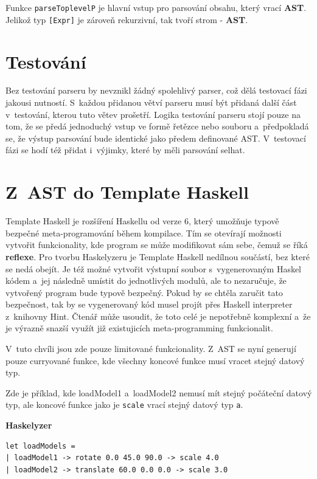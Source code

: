 \documentclass[male, czech]{kithesis}
\newcommand{\haskellInline}[1]{\colorbox{gray!10}{\texttt{#1}}}
\begin{document}
Funkce \haskellInline{parseToplevelP} je hlavní vstup pro parsování obsahu,
který vrací \textbf{AST}. 
Jelikož typ \haskellInline{[Expr]} je zároveň rekurzivní,
tak tvoří strom - \textbf{AST}.

\section{Testování}

Bez testování parseru by nevznikl žádný spolehlivý parser, 
což dělá testovací fázi jakousi nutností.
S~každou přidanou větví parseru musí být přidaná další část v~testování,
kterou tuto větev prošetří. 
Logika testování parseru stojí pouze na tom,
že se předá jednoduchý vstup ve formě řetězce nebo souboru
a~předpokladá se, 
že výstup parsování bude identické jako předem definované AST.
V~testovací fázi se hodí též přidat i~výjimky,
které by měli parsování selhat.

\section{Z~AST do Template Haskell}
Template Haskell je rozšíření Haskellu od verze 6, 
který umožňuje typově bezpečné meta-programování během kompilace.
Tím se otevírají možnosti vytvořit funkcionality, 
kde program se může modifikovat sám sebe, 
čemuž se říká \textbf{reflexe}.
Pro tvorbu Haskelyzeru je Template Haskell nedílnou součástí,
bez které se nedá obejít.
Je též možné vytvořit výstupní soubor s~vygenerovaným Haskel kódem
a~jej následně umístit do jednotlivých modulů,
ale to nezaručuje, 
že vytvořený program bude typově bezpečný.
Pokud by se chtěla zaručit tato bezpečnost,
tak by se vygenerovaný kód musel projít přes 
Haskell interpreter z~knihovny Hint.
Čtenář může usoudit, 
že toto celé je nepotřebně komplexní
a~že je výrazně snazší využít již existujicích meta-programming funkcionalit. 

V~tuto chvíli jsou zde pouze limitované funkcionality.
Z~AST se nyní generují pouze curryované funkce,
kde všechny koncové funkce musí vracet stejný datový typ.

Zde je příklad, 
kde loadModel1
a~loadModel2 nemusí mít stejný počáteční datový typ, 
ale koncové funkce jako je \haskellInline{scale} 
vrací stejný datový typ \haskellInline{a}.

\textbf{Haskelyzer}
\begin{verbatim}
let loadModels =
| loadModel1 -> rotate 0.0 45.0 90.0 -> scale 4.0
| loadModel2 -> translate 60.0 0.0 0.0 -> scale 3.0
\end{verbatim}
\end{document}
